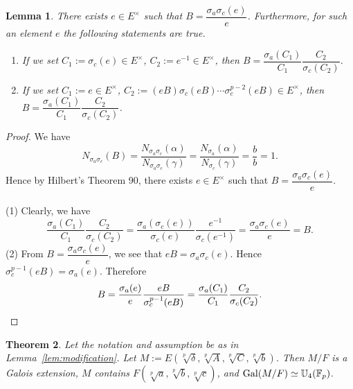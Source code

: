\documentclass[12pt,leqno]{amsart}
\theoremstyle{plain}
\newtheorem{thm}{Theorem}[section]
\newtheorem{lem}[thm]{Lemma}
\theoremstyle{definition}
\newcommand{\F}{{\mathbb F}}
\newcommand{\U}{{\mathbb U}}
\begin{document}
\begin{lem}
\label{lem:C1C2}
There exists $e\in E^\times$  such that $B= \dfrac{\sigma_a\sigma_c(e)}{e}$. Furthermore, for such an element $e$ the following statements are true.
\begin{enumerate}
\item If we set $C_1:=\sigma_c(e)\in E^\times$, $C_2:=e^{-1}\in E^\times$, then $B=\dfrac{\sigma_a(C_1)}{C_1} \dfrac{C_2}{\sigma_c(C_2)}$.
\item If we set $C_1:=e \in E^\times$, $C_2:=(eB)\sigma_c(eB)\cdots \sigma_c^{p-2}(eB)\in E^\times$, then $B=\dfrac{\sigma_a(C_1)}{C_1} \dfrac{C_2}{\sigma_c(C_2)}$.
\end{enumerate}
\end{lem}
\begin{proof}
We have 
\[ N_{\sigma_a\sigma_c}(B)=\frac{N_{\sigma_a\sigma_c}(\alpha)}{N_{\sigma_a\sigma_c}(\gamma)}=\frac{N_{\sigma_a}(\alpha)}{N_{\sigma_c}(\gamma)}=\frac{b}{b}=1.
\]
 Hence by Hilbert's Theorem 90, there exists $e \in E^\times$ such  that 
$B=\dfrac{\sigma_a\sigma_c(e)}{e}. $
 \\
 \\
 (1) Clearly, we have 
 \[
 \dfrac{\sigma_a(C_1)}{C_1} \frac{C_2}{\sigma_c(C_2)}=\dfrac{\sigma_a(\sigma_c(e))}{\sigma_c(e)} \frac{e^{-1}}{\sigma_c(e^{-1})}=\dfrac{\sigma_a\sigma_c(e)}{e}=B.
 \]
  (2) From $B=\dfrac{\sigma_a\sigma_c(e)}{e}$, we see that $eB= \sigma_a\sigma_c(e)$. Hence $\sigma_c^{p-1}(eB)=\sigma_a(e)$. Therefore 
  \[
  B=\frac{\sigma_a(e)}{e}\frac{eB}{\sigma_c^{p-1}(eB)}=  \frac{\sigma_a(C_1)}{C_1} \frac{C_2}{\sigma_c(C_2)}.
  \qedhere
  \]
\end{proof}
\begin{thm} 
\label{thm:construction}
Let the  notation and assumption be as in Lemma~\ref{lem:modification}. Let $M:= E(\sqrt[p]{\delta},\sqrt[p]{A},\sqrt[p]{C},\sqrt[p]{b})$. Then $M/F$ is a Galois extension, $M$ contains $F(\sqrt[p]{a},\sqrt[p]{b},\sqrt[p]{c})$, and ${\rm Gal}(M/F)\simeq \U_4(\F_p)$.
\end{thm}
\end{document}
